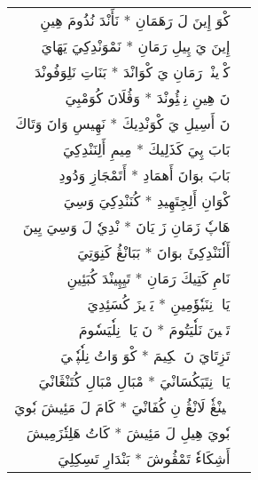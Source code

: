 \documentclass[a4paper, 12pt]{report}
\begin{document}

\begin{longtable}{rl}


\textarabic{كْوَ إِينَ لَ رَهَمَانِ  *  نَأَنْدَ نُذُومَ هِينِ} & \\ 
\textarabic{إِينَ يَ پِيلِ رَمَانِ  *  نَمْوَنْدِكِيَ يَهَايَ} & \\ 
[8mm] 

\textarabic{كْوٖينْيٖ رَمَانِ يَ كْوَانْدَ  *  بَنَاتِ نَلِوَفُونْدَ} & \\ 
\textarabic{نَ هِينِ نِمٖئُِونْدَ  *  وَڤُلَانَ كُوَمْبِيَ} & \\ 
[8mm] 

\textarabic{نَ أَسِيلِ يَ كْوَنْدِيكَ  *  نَهِيسِ وَانَ وَتَاكَ} & \\ 
\textarabic{بَابَ پِيَ كَذَلِيكَ  *  مِيمِ أَلِنَنْدِكِيَ} & \\ 
[8mm] 

\textarabic{بَابَ بوَانَ أَهمَادِ  *  أَتَمْجَازِ وَدُودِ} & \\ 
\textarabic{كْوَانِ أَلِجِتَهِيدِ  *  كُنَنْدِكِيَ وَسِيَ} & \\ 
[8mm] 

\textarabic{هَاپٗ زَمَانِ زَ يَانَ  *  نْدِيٗ لَ وَسِيَ يِينَ} & \\ 
\textarabic{أَلٗنَنْدِكِئَ بوَانَ  *  بَبَانْڠُ كَنِوَتِيَ} & \\ 
[8mm] 

\textarabic{نَامِ كَتِيكَ رَمَانِ  *  تَيِپِينْدَ كُبَئِينِ} & \\ 
\textarabic{يَالٖ نِنَيٗؤَمِينِ  *  يَوٖيزَ كُسَئِدِيَ} & \\ 
[8mm] 

\textarabic{تَنٖينَ نَلٗيَتُومَ  *  نَ يَالٖ نِلٗيَسٗومَ} & \\ 
\textarabic{تَزِتَايَ نَ هٖكِيمَ  *  كْوَ وَاتُ نِلٗپٗكٖيَ} & \\ 
[8mm] 

\textarabic{يَالٖ نِتَيَكُسَانْيَ  *  مْبَالِ مْبَالِ كُتَنْڠَانْيَ} & \\ 
\textarabic{لٖينْڠٗ لَانْڠُ نِ كُفَانْيَ  *  كَامَ لَ مَئِيشَ بٗويَ} & \\ 
[8mm] 

\textarabic{بٗويَ هِيلِ لَ مَئِيشَ  *  كَاتُ هَلِتٗزَمِيشَ} & \\ 
\textarabic{أَشِكَاءٗ تَمْڤُوشَ  *  بَنْدَارِ تَسِكِلِيَ} & \\ 
[8mm] 


\end{longtable}
\end{document}
